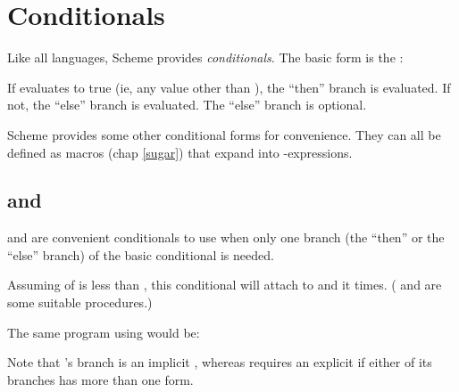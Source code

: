 \chapter{Conditionals}

Like all languages, Scheme provides {\em
conditionals}.  The basic form is the :


If  evaluates to true (ie, any value
other than ), the ``then'' branch is evaluated.
If not, the ``else'' branch  is evaluated.  The
``else'' branch  is optional.


Scheme provides some other conditional forms for
convenience.  They can all be defined as macros
(chap \ref{sugar}) that expand
into -expressions.


\section{ and }

 and  are convenient conditionals
to use when only one branch (the ``then'' or the
``else'' branch) of the basic conditional is needed.


Assuming  of  is less than
, this conditional will attach  to
 and  it  times.  (
and  are some suitable procedures.)

The same program using  would be:



Note that 's branch is an implicit ,
whereas  requires an explicit  if either
of its branches has more than one form.

